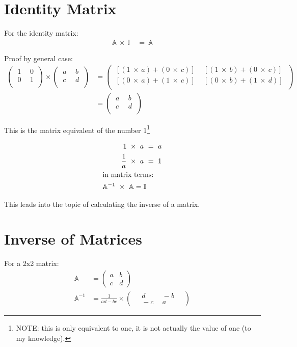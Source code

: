 \section{Identity Matrix}
\label{sec:IdentityMatrix}
For the identity matrix:
\begin{align}
  \mathbb{A}~\times~\mathbb{I}~&=~\mathbb{A} \nonumber
\end{align}

Proof by general case:
\begin{align}
  \begin{pmatrix}
    ~1~&~0~\\
    ~0~&~1~\\
  \end{pmatrix}
  \times
  \begin{pmatrix}
    ~a~&~b~\\
    ~c~&~d~\\
  \end{pmatrix}
  &=
  \begin{pmatrix}
    ~[(1~\times~a)+(0~\times~c)]~&~[(1~\times~b)+(0~\times~c)]~\\
    ~[(0~\times~a)+(1~\times~c)]~&~[(0~\times~b)+(1~\times~d)]~\\
  \end{pmatrix}\\
  &=
  \begin{pmatrix}
    ~a~&~b~\\
    ~c~&~d~\\
  \end{pmatrix}
\end{align}

This is the matrix equivalent of the number 1\footnote{NOTE: this is only
equivalent to one, it is not actually the value of one (to my knowledge).}

\begin{align}
  1~\times~a~&=~a \\
  \frac{1}{a}~\times~a~&=~1 \\
  \intertext{in matrix terms:}
  \mathbb{A}^{-1}~\times~\mathbb{A} = \mathbb{I}
\end{align}

This leads into the topic of calculating the inverse of a matrix.

\section{Inverse of Matrices}
\label{sec:InverseOfMatrices}
For a 2x2 matrix:
\begin{align}
  \mathbb{A} & = 
    \begin{pmatrix}
      a & b \\
      c & d
    \end{pmatrix}
    \\
  \mathbb{A}^{-1} & =
    \frac{1}{ad-bc} \times
    \begin{pmatrix}
      &~d~&~-b~& \\
      &~-c~&~a~&
    \end{pmatrix}  
\end{align}

